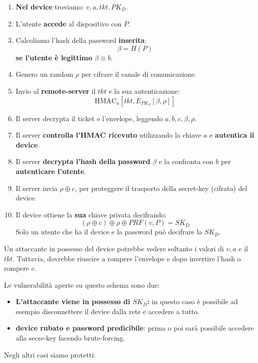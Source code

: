 \begin{definition}\label{def:keyretr}
\begin{enumerate}
    \item \textbf{Nel device} troviamo: $v,a,tkt,PK_D$.
    \item L'utente \textbf{accede} al dispositivo con $P$.
    \item Calcoliamo l'hash della password \textbf{inserita}:\[\beta=H(P)\]
    \textbf{se l'utente è legittimo} $\beta\equiv b$.
    \item Genero un random $\rho$ per cifrare il canale di comunicazione.
    \item Invio al \textbf{remote-server} il $tkt$ e la sua autenticazione:
    \[\text{HMAC}_a[tkt, E_{PK_S}[\beta,\rho]]\]
    \item Il server decrypta il ticket e l'envelope, leggendo $a,b,c,\beta,\rho$.
    \item Il server \textbf{controlla l'HMAC ricevuto} utilizzando la chiave $a$ e \textbf{autentica il device}.
    \item Il server \textbf{decrypta l'hash della password} $\beta$ e la confronta con $b$ per \textbf{autenticare l'utente}.
    \item Il server invia $\rho\oplus c$, per proteggere il trasporto della secret-key (cifrata) del device.
    \item Il device ottiene la \textbf{sua} chiave privata decifrando:
    \[(\rho \oplus c)\oplus \rho \oplus PRF(v,P)=SK_D\]
    Solo un utente che ha il device e la password può decifrare la $SK_D$.
    \end{enumerate}
\end{definition}
\begin{note}
Un attaccante in possesso del device potrebbe vedere soltanto i valori di $v,a$ e il $tkt$. Tuttavia, dovrebbe riuscire a rompere l'envelope e dopo invertire l'hash o rompere $c$.
\end{note}
Le vulnerabilità aperte su questo schema sono due:
\begin{itemize}
    \item \textbf{L'attaccante viene in possesso di $SK_D$:} in questo caso è possibile ad esempio disconnettere il device dalla rete e accedere a tutto.
    \item \textbf{device rubato e password predicibile}: prima o poi sarà possibile accedere alla secre-key facendo brute-forcing.
\end{itemize}
Negli altri casi siamo protetti:
